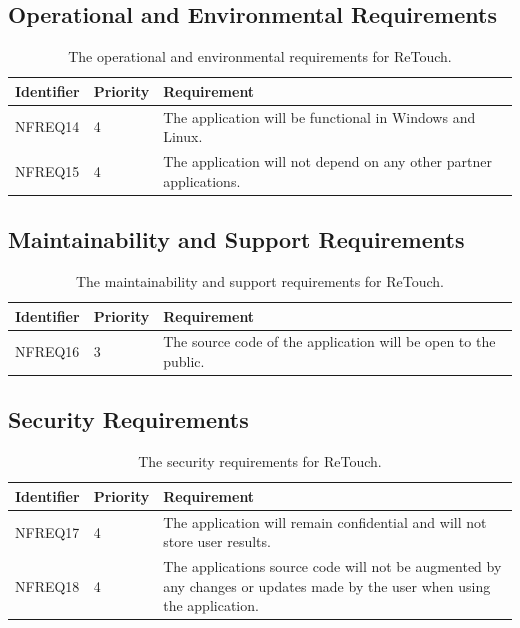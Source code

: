 \documentclass[12pt, titlepage]{article}
\begin{document}
\subsection{Operational and Environmental Requirements}

\begin{table}[H]
  \caption{The operational and environmental requirements for ReTouch.}
\begin{tabular}{ |m{2cm}|m{1.8cm}|m{9.4cm}| }
    \hline
    \textbf{Identifier} & \textbf{Priority} & \textbf{Requirement} \\ 
    \hline
    NFREQ14 & 4 & The application will be functional in Windows and Linux. \\
    \hline
    NFREQ15 & 4 & The application will not depend on any other partner applications. \\
    \hline
\end{tabular}
\end{table}

\subsection{Maintainability and Support Requirements}

\begin{table}[H]
  \caption{The maintainability and support requirements for ReTouch.}
\begin{tabular}{ |m{2cm}|m{1.8cm}|m{9.4cm}| }
    \hline
    \textbf{Identifier} & \textbf{Priority} & \textbf{Requirement} \\ 
    \hline
    NFREQ16 & 3 & The source code of the application will be open to the public. \\
    \hline
\end{tabular}
\end{table}

\subsection{Security Requirements}

\begin{table}[H]
  \caption{The security requirements for ReTouch.}
\begin{tabular}{ |m{2cm}|m{1.8cm}|m{9.4cm}| }
    \hline
    \textbf{Identifier} & \textbf{Priority} & \textbf{Requirement} \\ 
    \hline
    NFREQ17 & 4 & The application will remain confidential and will not store user results.\\
    \hline
    NFREQ18 & 4 & The applications source code will not be augmented by any changes or updates made by the user when using the application. \\
    \hline
\end{tabular}
\end{table}
\end{document}
